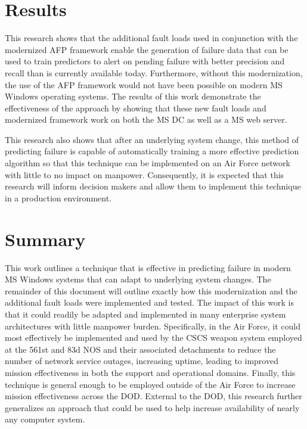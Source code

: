 \section{Results}
This research shows that the additional fault loads used in conjunction with
the modernized \ac{AFP} framework enable the generation of failure data that
can be used to train predictors to alert on pending failure with better
precision and recall than is currently available today.  Furthermore, without
this modernization, the use of the \ac{AFP} framework would not have been
possible on modern \ac{MS} Windows operating systems.  The results of this work
demonstrate the effectiveness of the approach by showing that these new fault
loads and modernized framework work on both the \ac{MS} \ac{DC} as well as a
\ac{MS} web server.

This research also shows that after an underlying system change, this
method of predicting failure is capable of automatically training a more
effective prediction algorithm so that this technique can be implemented on an
Air Force network with little to no impact on manpower.  Consequently, it is
expected that this research will inform decision makers and allow them to
implement this technique in a production environment.

\section{Summary}
This work outlines a technique that is effective in predicting failure in
modern \ac{MS} Windows systems that can adapt to underlying system changes.
The remainder of this document will outline exactly how this modernization and
the additional fault loads were implemented and tested.  The impact of this
work is that it could readily be adapted and implemented in many enterprise
system architectures with little manpower burden.  Specifically, in the Air
Force, it could most effectively be implemented and used by the \ac{CSCS}
weapon system employed at the 561st and 83d \ac{NOS} and their associated
detachments to reduce the number of network service outages, increasing uptime,
leading to improved mission effectiveness in both the support and operational
domains.  Finally, this technique is general enough to be employed outside of
the Air Force to increase mission effectiveness across the \ac{DOD}.  External
to the \ac{DOD}, this research further generalizes an approach that could be
used to help increase availability of nearly any computer system.

